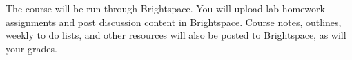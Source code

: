 The course will be run through Brightspace. You will upload lab homework assignments and post discussion content in Brightspace. Course notes, outlines, weekly to do lists, and other resources will also be posted to Brightspace, as will your grades.